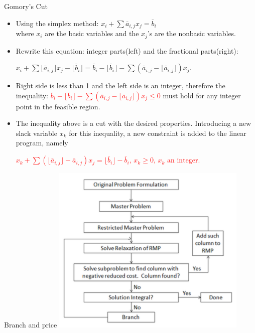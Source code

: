     \begin{frame}{Gomory's Cut}
      \begin{itemize}

      \item Using the simplex method:
      $x_{i}+\sum{\bar {a}}_{i,j}x_{j}={\bar {b}}_{i}$ \\

      where $x_i$ are the basic variables and the $x_j$'s are the nonbasic variables.

      \item Rewrite this equation: integer parts(left) and the fractional parts(right):

      $x_{i}+\sum \lfloor {\bar {a}}_{i,j}\rfloor x_{j}-\lfloor {\bar {b}}_{i}\rfloor ={\bar {b}}_{i}-\lfloor {\bar {b}}_{i}\rfloor -\sum ({\bar {a}}_{i,j}-\lfloor {\bar {a}}_{i,j}\rfloor )x_{j}.$ \\

      \item Right side is less than 1 and the left side is an integer, therefore the inequality:
      \textcolor{red}{${\bar {b}}_{i}-\lfloor {\bar {b}}_{i}\rfloor -\sum ({\bar {a}}_{i,j}-\lfloor {\bar {a}}_{i,j}\rfloor )x_{j}\leq 0 $}
      must hold for any integer point in the feasible region.

      \item The inequality above is a cut with the desired properties. Introducing a new slack variable $x_k$ for this inequality, a new constraint is added to the linear program, namely

      \textcolor{red}{$x_{k}+\sum (\lfloor {\bar {a}}_{i,j}\rfloor -{\bar {a}}_{i,j})x_{j}=\lfloor {\bar {b}}_{i}\rfloor -{\bar {b}}_{i},\,x_{k}\geq 0,\,x_{k}{\mbox{ an integer}}$.}
      \end{itemize}
    \end{frame}

    \begin{frame}{Branch and price}
      \centering
      \includegraphics[width = 0.7\textwidth]{images/branch_price.png}
    \end{frame}

